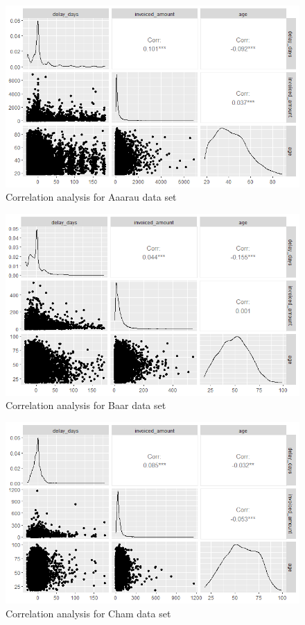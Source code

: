 \documentclass{article}
\begin{document}
\begin{figure}
    \centering
    \includegraphics[width=\textwidth]{fig/ex-src-aarau-corr.png}
    \caption{Correlation analysis for Aaarau data set}
    \label{fig:ex-src-aarau-corr}
\end{figure}
\begin{figure}
    \centering
    \includegraphics[width=\textwidth]{fig/ex-src-baar-corr.png}
    \caption{Correlation analysis for Baar data set}
    \label{fig:ex-src-baar-corr}
\end{figure}
\begin{figure}
    \centering
    \includegraphics[width=\textwidth]{fig/ex-src-cham-corr.png}
    \caption{Correlation analysis for Cham data set}
    \label{fig:ex-src-cham-corr}
\end{figure}
\end{document}
